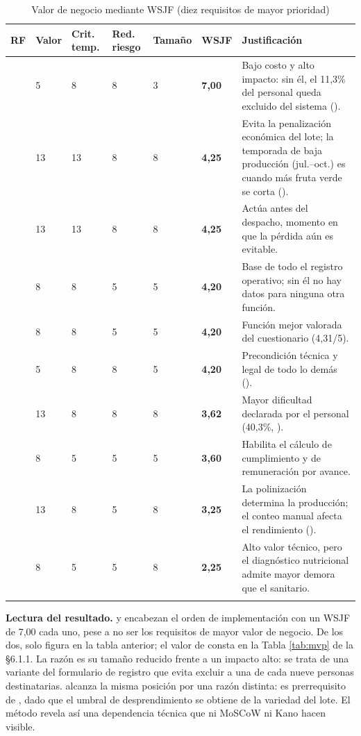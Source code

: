 \begin{longtable}{|C{1.4cm}|C{1.3cm}|C{1.3cm}|C{1.3cm}|C{1.3cm}|C{1.4cm}|L{5.4cm}|}
\hline
{}\textbf{RF} & \textbf{Valor} & \textbf{Crit. temp.} & \textbf{Red. riesgo} & \textbf{Tamaño} & \textbf{WSJF} & \textbf{Justificación} \\
\hline
\endhead
{} & 5 & 8 & 8 & 3 & \textbf{7,00} & Bajo costo y alto impacto: sin él, el 11,3\% del personal queda excluido del sistema (). \\ \hline
{} & 13 & 13 & 8 & 8 & \textbf{4,25} & Evita la penalización económica del lote; la temporada de baja producción (jul.--oct.) es cuando más fruta verde se corta (). \\ \hline
{} & 13 & 13 & 8 & 8 & \textbf{4,25} & Actúa antes del despacho, momento en que la pérdida aún es evitable. \\ \hline
{} & 8 & 8 & 5 & 5 & \textbf{4,20} & Base de todo el registro operativo; sin él no hay datos para ninguna otra función. \\ \hline
{} & 8 & 8 & 5 & 5 & \textbf{4,20} & Función mejor valorada del cuestionario (4,31/5). \\ \hline
{} & 5 & 8 & 8 & 5 & \textbf{4,20} & Precondición técnica y legal de todo lo demás (). \\ \hline
{} & 13 & 8 & 8 & 8 & \textbf{3,62} & Mayor dificultad declarada por el personal (40,3\%, ). \\ \hline
{} & 8 & 5 & 5 & 5 & \textbf{3,60} & Habilita el cálculo de cumplimiento y de remuneración por avance. \\ \hline
{} & 13 & 8 & 5 & 8 & \textbf{3,25} & La polinización determina la producción; el conteo manual afecta el rendimiento (). \\ \hline
{} & 8 & 5 & 5 & 8 & \textbf{2,25} & Alto valor técnico, pero el diagnóstico nutricional admite mayor demora que el sanitario. \\ \hline

\caption{Valor de negocio mediante WSJF (diez requisitos de mayor prioridad)}
\end{longtable}

\noindent
\textbf{Lectura del resultado.}  y  encabezan el orden de implementación con un
WSJF de 7,00 cada uno, pese a no ser los requisitos de mayor valor de negocio. De los dos, solo
 figura en la tabla anterior; el valor de  consta en la Tabla \ref{tab:mvp} de
la §6.1.1. La razón es su tamaño reducido frente a un
impacto alto: se trata de una variante del formulario de registro que evita excluir a una de cada
nueve personas destinatarias.  alcanza la misma posición por una razón distinta: es
prerrequisito de , dado que el umbral de desprendimiento se obtiene de la variedad del
lote. El método revela así una dependencia técnica que ni MoSCoW ni Kano hacen visible.

